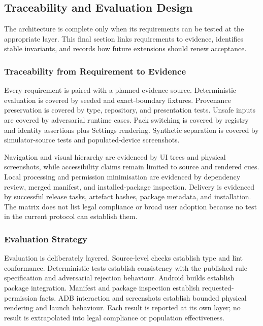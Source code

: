 \subsection{Traceability and Evaluation Design}

The architecture is complete only when its requirements can be tested at the appropriate layer. This final section links requirements to evidence, identifies stable invariants, and records how future extensions should renew acceptance.

\subsubsection{Traceability from Requirement to Evidence}

Every requirement is paired with a planned evidence source. Deterministic evaluation is covered by seeded and exact-boundary fixtures. Provenance preservation is covered by type, repository, and presentation tests. Unsafe inputs are covered by adversarial runtime cases. Pack switching is covered by registry and identity assertions plus Settings rendering. Synthetic separation is covered by simulator-source tests and populated-device screenshots.

Navigation and visual hierarchy are evidenced by UI trees and physical screenshots, while accessibility claims remain limited to source and rendered cues. Local processing and permission minimisation are evidenced by dependency review, merged manifest, and installed-package inspection. Delivery is evidenced by successful release tasks, artefact hashes, package metadata, and installation. The matrix does not list legal compliance or broad user adoption because no test in the current protocol can establish them.

\subsubsection{Evaluation Strategy}

Evaluation is deliberately layered. Source-level checks establish type and lint conformance. Deterministic tests establish consistency with the published rule specification and adversarial rejection behaviour. Android builds establish package integration. Manifest and package inspection establish requested-permission facts. ADB interaction and screenshots establish bounded physical rendering and launch behaviour. Each result is reported at its own layer; no result is extrapolated into legal compliance or population effectiveness.

